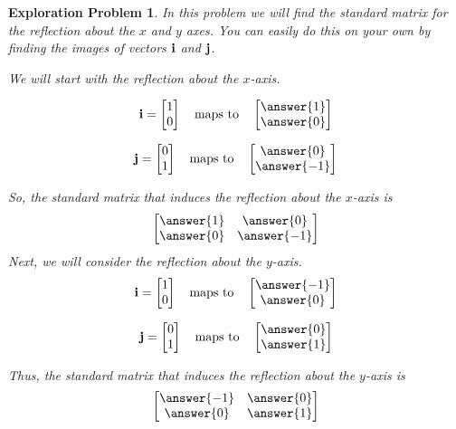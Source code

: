 \documentclass{ximera}
\renewcommand{\vec}[1]{{\bf #1}}
\newtheorem{initprob}{Exploration Problem}
\begin{document}
\begin{initprob}\label{init:reflectionxyaxes}
In this problem we will find the standard matrix for the reflection about the $x$ and $y$ axes.  You can easily do this on your own by finding the images of vectors $\vec{i}$ and $\vec{j}$.  
  
  We will start with the reflection about the $x$-axis.
  
  $$\vec{i}=\begin{bmatrix}1\\0\end{bmatrix}\quad\text{maps to}\quad\begin{bmatrix}\answer{1}\\\answer{0}\end{bmatrix}$$
  
  $$\vec{j}=\begin{bmatrix}0\\1\end{bmatrix}\quad\text{maps to}\quad\begin{bmatrix}\answer{0}\\\answer{-1}\end{bmatrix}$$
  
  So, the standard matrix that induces the reflection about the $x$-axis is
  $$\begin{bmatrix}\answer{1}&\answer{0}\\\answer{0}&\answer{-1}\end{bmatrix}$$
Next, we will consider the reflection about the $y$-axis.
$$\vec{i}=\begin{bmatrix}1\\0\end{bmatrix}\quad\text{maps to}\quad\begin{bmatrix}\answer{-1}\\\answer{0}\end{bmatrix}$$
  
  $$\vec{j}=\begin{bmatrix}0\\1\end{bmatrix}\quad\text{maps to}\quad\begin{bmatrix}\answer{0}\\\answer{1}\end{bmatrix}$$
  
  Thus, the standard matrix that induces the reflection about the $y$-axis is
  $$\begin{bmatrix}\answer{-1}&\answer{0}\\\answer{0}&\answer{1}\end{bmatrix}$$
  
  \end{initprob}
  
\end{document}
